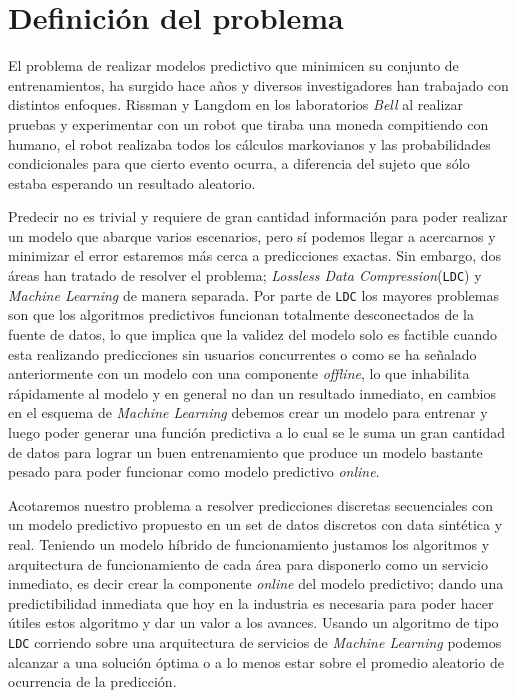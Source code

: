

\section{Definición del problema}


El problema de realizar modelos predictivo que minimicen su conjunto de entrenamientos, ha surgido hace años y diversos investigadores han trabajado con distintos enfoques. Rissman \cite{Rissanen1983} y Langdom \cite{Langdon1983} en los laboratorios \emph{Bell} al realizar pruebas y experimentar con un robot que tiraba una moneda compitiendo con humano, el robot realizaba todos los cálculos {markovianos} y las probabilidades condicionales para que cierto evento ocurra, a diferencia del sujeto que sólo estaba esperando un resultado aleatorio.

Predecir no es trivial y requiere de gran cantidad información para poder realizar un modelo que abarque varios escenarios, pero sí podemos llegar a acercarnos y minimizar el error  estaremos más cerca a predicciones exactas. Sin embargo, dos áreas han tratado de resolver el problema;  \emph{Lossless Data Compression}(\texttt{LDC}) y \emph{Machine Learning} de manera separada. Por parte de \texttt{LDC} los mayores problemas son que los algoritmos predictivos  funcionan totalmente desconectados de la fuente de datos, lo que implica que la validez del modelo solo es factible cuando esta realizando predicciones sin usuarios concurrentes o como se ha señalado anteriormente con un modelo con una componente \emph{offline}, lo que inhabilita rápidamente al modelo y en general no dan un resultado inmediato, en cambios en el esquema de \emph{Machine Learning} debemos crear un modelo para entrenar y luego poder generar una función predictiva a lo cual se le suma un gran cantidad de datos para lograr un buen entrenamiento que produce un modelo bastante pesado para poder funcionar como modelo predictivo \emph{online}. 

Acotaremos nuestro problema a resolver predicciones discretas secuenciales con un modelo predictivo propuesto en un set de datos discretos con data sintética y real. Teniendo un modelo híbrido de funcionamiento justamos los algoritmos y arquitectura de funcionamiento de cada área para disponerlo como un servicio inmediato, es decir crear la componente \emph{online} del modelo predictivo; dando una predictibilidad inmediata que hoy en la industria es necesaria para poder hacer útiles estos algoritmo y dar un valor a los avances. Usando un algoritmo de tipo \texttt{LDC} corriendo sobre una arquitectura de  servicios de \emph{Machine Learning} podemos alcanzar a una solución óptima o a lo menos estar sobre el promedio aleatorio de ocurrencia de la predicción.

